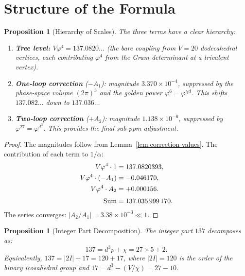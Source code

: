 \documentclass[11pt,a4paper]{article}
\theoremstyle{plain}
\newtheorem{proposition}[theorem]{Proposition}
\theoremstyle{definition}
\newcommand{\vp}{\varphi}
\begin{document}
\section{Structure of the Formula}\label{sec:structure}

\begin{proposition}[Hierarchy of Scales]\label{prop:hierarchy}
The three terms have a clear hierarchy:
\begin{enumerate}[nosep]
  \item \textbf{Tree level:} $V\vp^4 = 137.0820\ldots$ (the bare
    coupling from $V = 20$ dodecahedral vertices, each contributing
    $\vp^4$ from the Gram determinant at a trivalent vertex).
  \item \textbf{One-loop correction} ($-A_1$): magnitude $3.370 \times 10^{-4}$,
    suppressed by the phase-space volume $(2\pi)^3$ and the golden
    power $\vp^6 = \vp^{\chi d}$.  This shifts $137.082\ldots$ down to
    $137.036\ldots$
  \item \textbf{Two-loop correction} ($+A_2$): magnitude $1.138 \times 10^{-6}$,
    suppressed by $\vp^{27} = \vp^{d^3}$.  This provides the final
    sub-ppm adjustment.
\end{enumerate}
\end{proposition}

\begin{proof}
The magnitudes follow from Lemma~\ref{lem:correction-values}.
The contribution of each term to $1/\alpha$:
\begin{align*}
  V\vp^4 \cdot 1 &= 137.0820393, \\
  V\vp^4 \cdot (-A_1) &= -0.046170, \\
  V\vp^4 \cdot A_2 &= +0.000156. \\[\jot]
  \text{Sum} &= 137.035\,999\,170.
\end{align*}
The series converges: $|A_2/A_1| = 3.38 \times 10^{-3} \ll 1$.
\end{proof}

\begin{proposition}[Integer Part Decomposition]\label{prop:integer-decomp}
The integer part $137$ decomposes as:
\[
  137 = d^3 p + \chi = 27 \times 5 + 2.
\]
Equivalently, $137 = |2I| + 17 = 120 + 17$, where $|2I| = 120$ is the
order of the binary icosahedral group and $17 = d^3 - (V/\chi) = 27 - 10$.
\end{proposition}
\end{document}
